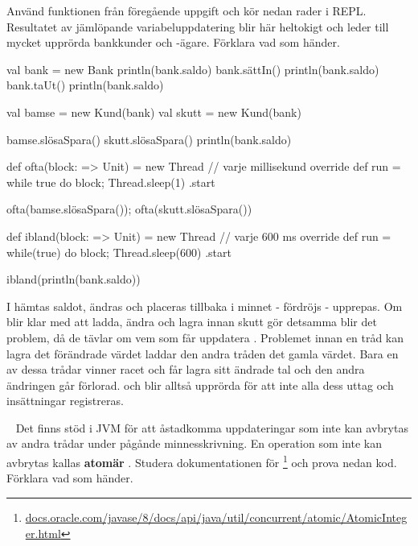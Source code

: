 \Subtask Använd funktionen  från föregående uppgift och kör nedan rader i REPL. Resultatet av jämlöpande variabeluppdatering blir här heltokigt och leder till mycket upprörda bankkunder och -ägare. Förklara vad som händer.

\begin{REPL}
val bank = new Bank
println(bank.saldo)
bank.sättIn()
println(bank.saldo)
bank.taUt()
println(bank.saldo)

val bamse = new Kund(bank)
val skutt = new Kund(bank)

bamse.slösaSpara()
skutt.slösaSpara()
println(bank.saldo)

def ofta(block: => Unit) = new Thread { // varje millisekund
  override def run = while true do { block;  Thread.sleep(1)} 
}.start

ofta(bamse.slösaSpara()); ofta(skutt.slösaSpara())

def ibland(block: => Unit) = new Thread {  // varje 600 ms
  override def run = while(true) do { block; Thread.sleep(600) }
}.start

ibland(println(bank.saldo))
\end{REPL}


\SOLUTION


\TaskSolved \what

\SubtaskSolved  I  hämtas saldot, ändras och placeras tillbaka i minnet -  fördröjs -  upprepas. Om  blir klar med att ladda, ändra och lagra innan skutt gör detsamma blir det problem, då de tävlar om vem som får uppdatera . Problemet innan en tråd kan lagra det förändrade värdet laddar den andra tråden det gamla värdet. Bara en av dessa trådar vinner racet och får lagra sitt ändrade tal och den andra ändringen går förlorad.  och  blir alltså upprörda för att inte alla dess uttag och insättningar registreras.


\QUESTEND







\QUESTBEGIN

\Task  \what~  Det finns stöd i JVM för att åstadkomma uppdateringar som inte kan avbrytas av andra trådar under pågånde minnesskrivning. En operation som inte kan avbrytas kallas \textbf{atomär} . Studera dokumentationen för \footnote{\href{https://docs.oracle.com/javase/8/docs/api/java/util/concurrent/atomic/AtomicInteger.html}{docs.oracle.com/javase/8/docs/api/java/util/concurrent/atomic/AtomicInteger.html}} och prova nedan kod. Förklara vad som händer.

